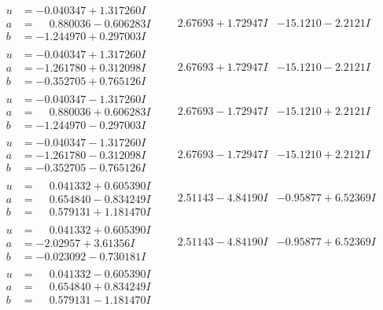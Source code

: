 \documentclass[1p]{elsarticle_modified}
\theoremstyle{definition}
\begin{document}
$$\begin{array}{c|c|c}
\begin{aligned}
u &= -0.040347 + 1.317260 I \\
a &= \phantom{-}0.880036 - 0.606283 I \\
b &= -1.244970 + 0.297003 I\end{aligned}
 & \phantom{-}2.67693 + 1.72947 I & -15.1210 - 2.2121 I \\ \hline\begin{aligned}
u &= -0.040347 + 1.317260 I \\
a &= -1.261780 + 0.312098 I \\
b &= -0.352705 + 0.765126 I\end{aligned}
 & \phantom{-}2.67693 + 1.72947 I & -15.1210 - 2.2121 I \\ \hline\begin{aligned}
u &= -0.040347 - 1.317260 I \\
a &= \phantom{-}0.880036 + 0.606283 I \\
b &= -1.244970 - 0.297003 I\end{aligned}
 & \phantom{-}2.67693 - 1.72947 I & -15.1210 + 2.2121 I \\ \hline\begin{aligned}
u &= -0.040347 - 1.317260 I \\
a &= -1.261780 - 0.312098 I \\
b &= -0.352705 - 0.765126 I\end{aligned}
 & \phantom{-}2.67693 - 1.72947 I & -15.1210 + 2.2121 I \\ \hline\begin{aligned}
u &= \phantom{-}0.041332 + 0.605390 I \\
a &= \phantom{-}0.654840 - 0.834249 I \\
b &= \phantom{-}0.579131 + 1.181470 I\end{aligned}
 & \phantom{-}2.51143 - 4.84190 I & -0.95877 + 6.52369 I \\ \hline\begin{aligned}
u &= \phantom{-}0.041332 + 0.605390 I \\
a &= -2.02957 + 3.61356 I \\
b &= -0.023092 - 0.730181 I\end{aligned}
 & \phantom{-}2.51143 - 4.84190 I & -0.95877 + 6.52369 I \\ \hline\begin{aligned}
u &= \phantom{-}0.041332 - 0.605390 I \\
a &= \phantom{-}0.654840 + 0.834249 I \\
b &= \phantom{-}0.579131 - 1.181470 I\end{aligned}

\end{array}$$
\end{document}
